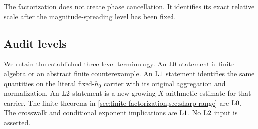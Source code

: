 The factorization does not create phase cancellation.  It identifies
its exact relative scale after the magnitude-spreading level has
been fixed.

\subsection{Audit levels}

We retain the established three-level terminology.  An \(\mathrm{L0}\)
statement is finite algebra or an abstract finite counterexample.  An
\(\mathrm{L1}\) statement identifies the same quantities on the literal
fixed-\(h_0\) carrier with its original aggregation and
normalization.  An \(\mathrm{L2}\) statement is a new growing-\(X\)
arithmetic estimate for that carrier.  The finite theorems in
\cref{sec:finite-factorization,sec:sharp-range} are \(\mathrm{L0}\).
The crosswalk and conditional exponent implications are \(\mathrm{L1}\).
No \(\mathrm{L2}\) input is asserted.
